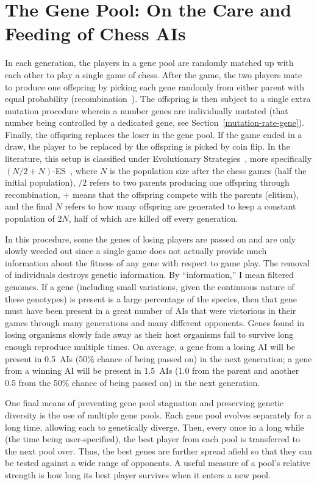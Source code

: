 \documentclass[letterpaper]{article}
\renewcommand{\_}{\allowbreak\textunderscore\allowbreak}
\begin{document}
\section{The Gene Pool: On the Care and Feeding of Chess AIs}

In each generation, the players in a gene pool are randomly matched up with each other to play a single game of chess. After the game, the two players mate to produce one offspring by picking each gene randomly from either parent with equal probability (recombination~\cite{recombination-wiki}). The offspring is then subject to a single extra mutation procedure wherein a number genes are individually mutated (that number being controlled by a dedicated gene, see Section~\ref{mutation-rate-gene}). Finally, the offspring replaces the loser in the gene pool. If the game ended in a draw, the player to be replaced by the offspring is picked by coin flip. In the literature, this setup is classified under Evolutionary Strategies~\cite{evolution-strategy-wiki}, more specifically \((N/2+N)\)-ES~\cite{evolution-strategy-glossary}, where \(N\) is the population size after the chess games (half the initial population), \(/2\) refers to two parents producing one offspring through recombination, \(+\) means that the offspring compete with the parents (elitism), and the final \(N\) refers to how many offspring are generated to keep a constant population of \(2N\), half of which are killed off every generation.

In this procedure, some the genes of losing players are passed on and are only slowly weeded out since a single game does not actually provide much information about the fitness of any gene with respect to game play. The removal of individuals destroys genetic information. By ``information,'' I mean filtered genomes. If a gene (including small variations, given the continuous nature of these genotypes) is present is a large percentage of the species, then that gene must have been present in a great number of AIs that were victorious in their games through many generations and many different opponents. Genes found in losing organisms slowly fade away as their host organisms fail to survive long enough reproduce multiple times. On average, a gene from a losing AI will be present in 0.5~AIs (50\% chance of being passed on) in the next generation; a gene from a winning AI will be present in 1.5~AIs (1.0 from the parent and another 0.5 from the 50\% chance of being passed on) in the next generation.

One final means of preventing gene pool stagnation and preserving genetic diversity is the use of multiple gene pools. Each gene pool evolves separately for a long time, allowing each to genetically diverge. Then, every once in a long while (the time being user-specified), the best player from each pool is transferred to the next pool over. Thus, the best genes are further spread afield so that they can be tested against a wide range of opponents. A useful measure of a pool's relative strength is how long its best player survives when it enters a new pool.
\end{document}
